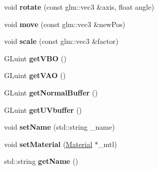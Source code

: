 \begin{DoxyCompactItemize}
\item 
\hypertarget{class_swift_1_1_object_a0ad97a59eba18ce2ab2c2f78ad7a14bb}{void {\bfseries rotate} (const glm\-::vec3 \&axis, float angle)}\label{class_swift_1_1_object_a0ad97a59eba18ce2ab2c2f78ad7a14bb}

\item 
\hypertarget{class_swift_1_1_object_a1b85f8ad0b60b47c97df22de669802a0}{void {\bfseries move} (const glm\-::vec3 \&new\-Pos)}\label{class_swift_1_1_object_a1b85f8ad0b60b47c97df22de669802a0}

\item 
\hypertarget{class_swift_1_1_object_ad9ac8b7d237f712224e99f17e0c05550}{void {\bfseries scale} (const glm\-::vec3 \&factor)}\label{class_swift_1_1_object_ad9ac8b7d237f712224e99f17e0c05550}

\item 
\hypertarget{class_swift_1_1_object_a1cac75564cd937ba90bc4401adfe27b5}{G\-Luint {\bfseries get\-V\-B\-O} ()}\label{class_swift_1_1_object_a1cac75564cd937ba90bc4401adfe27b5}

\item 
\hypertarget{class_swift_1_1_object_ac72cd5fa7364e1722d13bc68ac66743d}{G\-Luint {\bfseries get\-V\-A\-O} ()}\label{class_swift_1_1_object_ac72cd5fa7364e1722d13bc68ac66743d}

\item 
\hypertarget{class_swift_1_1_object_a8504beacff2b73bfb3532e40e8b685c0}{G\-Luint {\bfseries get\-Normal\-Buffer} ()}\label{class_swift_1_1_object_a8504beacff2b73bfb3532e40e8b685c0}

\item 
\hypertarget{class_swift_1_1_object_a5e2dc8186cb2f201f7fc71174a99e282}{G\-Luint {\bfseries get\-U\-Vbuffer} ()}\label{class_swift_1_1_object_a5e2dc8186cb2f201f7fc71174a99e282}

\item 
\hypertarget{class_swift_1_1_object_a50721e35e58987d0952785de8ca05297}{void {\bfseries set\-Name} (std\-::string \-\_\-name)}\label{class_swift_1_1_object_a50721e35e58987d0952785de8ca05297}

\item 
\hypertarget{class_swift_1_1_object_ad3449afb41a15af0523d2e73a165a25b}{void {\bfseries set\-Material} (\hyperlink{class_swift_1_1_material}{Material} $\ast$\-\_\-mtl)}\label{class_swift_1_1_object_ad3449afb41a15af0523d2e73a165a25b}

\item 
\hypertarget{class_swift_1_1_object_a0bd304548c71364a63702c458e28bcd3}{std\-::string {\bfseries get\-Name} ()}\label{class_swift_1_1_object_a0bd304548c71364a63702c458e28bcd3}

\end{DoxyCompactItemize}
